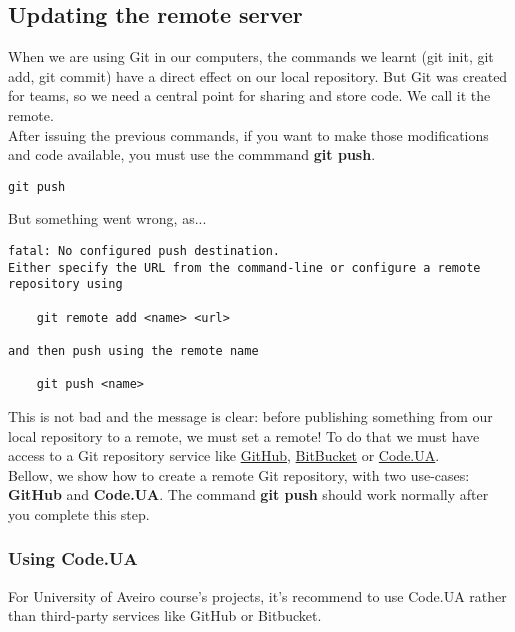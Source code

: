 \documentclass{article}
\begin{document}
\subsection{Updating the remote server}

When we are using Git in our computers, the commands we learnt (git init, git add, git commit) have a direct effect on our local repository. But Git was created for teams, so we need a central point for sharing and store code. We call it the remote.\\

After issuing the previous commands, if you want to make those modifications and code available, you must use the commmand \textbf{git push}.

\begin{lstlisting}
git push
\end{lstlisting}

But something went wrong, as...

\begin{lstlisting}
fatal: No configured push destination.
Either specify the URL from the command-line or configure a remote repository using

    git remote add <name> <url>

and then push using the remote name

    git push <name>

\end{lstlisting}

This is not bad and the message is clear: before publishing something from our local repository to a remote, we must set a remote! To do that we must have access to a Git repository service like \href{https://github.com}{GitHub}, \href{https://bitbucket.org}{BitBucket} or \href{http://code.ua.pt}{Code.UA}. \\

Bellow, we show how to create a remote Git repository, with two use-cases: \textbf{GitHub} and \textbf{Code.UA}. The command \textbf{git push} should work normally after you complete this step.


\subsubsection{Using Code.UA}

For University of Aveiro course's projects, it's recommend to use Code.UA rather than third-party services like GitHub or Bitbucket.\\
\end{document}
